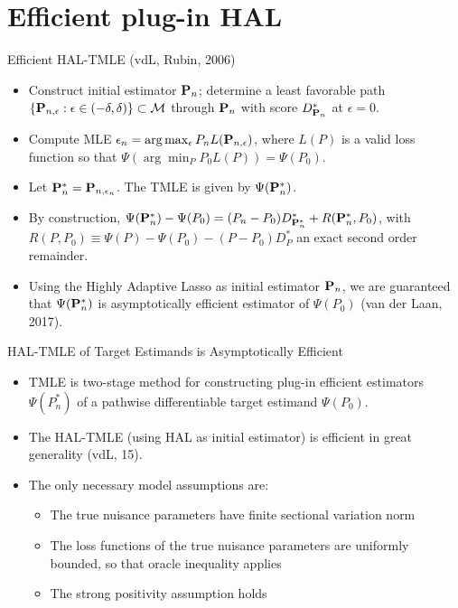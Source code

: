 \documentclass[t]{beamer}
\newlength{\wideitemsep}
\let\olditem\item
\renewcommand{\item}{\setlength{\itemsep}{\wideitemsep}\olditem}
\begin{document}
\section{Efficient plug-in HAL}
\begin{frame}{Efficient HAL-TMLE (vdL, Rubin, 2006)}
\begin{itemize}
\item Construct initial estimator ${\bf P}_n$; determine a least favorable path $\{{\bf P}_{n,\epsilon}:\epsilon\in (-\delta,\delta)\}\subset {\cal M}$ through ${\bf P}_n$ with score $D^*_{{\bf P}_n}$ at $\epsilon =0$.
\item Compute MLE $\epsilon_n =\arg\max_{\epsilon}P_n L({\bf P}_{n,\epsilon})$, where $L(P)$ is a valid loss function so that $\Psi(\arg\min_P P_0L(P))=\Psi(P_0)$.
\item Let ${\bf P}_n^*={\bf P}_{n,\epsilon_n}$. The TMLE is given by $\Psi({\bf P}_n^*)$.
\item By construction, $\Psi({\bf P}_n^*)-\Psi(P_0)=(P_n-P_0)D^*_{{\bf P}_n^*}+R({\bf P}_n^*,P_0)$, with $R(P,P_0)\equiv \Psi(P)-\Psi(P_0)-(P-P_0)D^*_P$ an exact second order remainder.
\item Using the Highly Adaptive Lasso as initial estimator ${\bf P}_n$, we are guaranteed that $\Psi({\bf P}_n^*)$ is asymptotically efficient estimator of $\Psi(P_0)$ (van der Laan, 2017).
\end{itemize}
\end{frame}
\begin{frame}{HAL-TMLE of Target Estimands is Asymptotically Efficient}
\begin{itemize}
\item TMLE is two-stage method for constructing plug-in efficient estimators $\Psi(P_n^*)$ of  a pathwise differentiable target estimand $\Psi(P_0)$.
\item
The HAL-TMLE (using HAL as initial estimator) is efficient in great generality (vdL, 15).
\item  The only necessary model assumptions are:
\begin{itemize}
\item The true nuisance parameters have finite sectional variation norm
\item The loss functions of the true nuisance parameters are uniformly bounded, so that oracle inequality applies
\item The strong positivity assumption holds
\end{itemize}
\end{itemize}
\end{frame}
\end{document}

